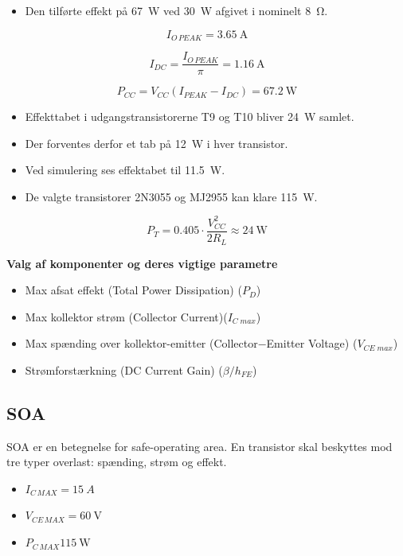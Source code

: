\documentclass[danish]{article}
\begin{document}
\begin{itemize}
	\item Den tilførte effekt på \SI{67}{\watt} ved \SI{30}{\watt} afgivet i nominelt \SI{8}{\ohm}. 
\end{itemize}

\begin{equation}
I_{O\,PEAK} = \SI{3.65}{\ampere}
\end{equation}

\begin{equation}
I_{DC} = \dfrac{I_{O\,PEAK}}{\pi} =\SI{1.16}{\ampere}
\end{equation}

\begin{equation}
P_{CC} = V_{CC}(I_{PEAK}-I_{DC})=\SI{67.2}{\watt}
\end{equation}

\begin{itemize}
	\item Effekttabet i udgangstransistorerne T9 og T10 bliver \SI{24}{\watt} samlet.
	\item Der forventes derfor et tab på \SI{12}{\watt} i hver transistor.
	\item Ved simulering ses effektabet til \SI{11.5}{\watt}.
	\item De valgte transistorer 2N3055 og MJ2955 kan klare \SI{115}{\watt}.
\end{itemize} 

\begin{equation}
P_T = 0.405 \cdot \dfrac{V_{CC}^2}{2 R_L} \approx \SI{24}{\watt}
\end{equation}

\textbf{Valg af komponenter og deres vigtige parametre}

\begin{itemize}
	\item Max afsat effekt (Total Power Dissipation) ($P_D$)
	\item Max kollektor strøm (Collector Current)($I_{C\;max}$)
	\item Max spænding over kollektor-emitter (Collector−Emitter Voltage) ($V_{CE\;max}$)
	\item Strømforstærkning (DC Current Gain) ($\beta / h_{FE}$)
\end{itemize}

\subsection{SOA}
SOA er en betegnelse for safe-operating area.
En transistor skal beskyttes mod tre typer overlast: spænding, strøm og effekt.
\begin{itemize}
	\item $I_{C\,MAX} = \SI{15}{A}$
	\item  $V_{CE\,MAX} = \SI{60}{\volt}$
	\item  $P_{C\,MAX} \SI{115}{\watt}$
\end{itemize}
\end{document}
